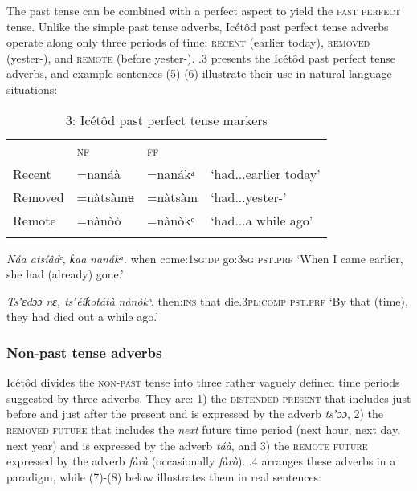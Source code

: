 \begin{table}
The past tense can be combined with a perfect aspect to yield the \textsc{past perfect }tense. Unlike the simple past tense adverbs, Icétôd past perfect tense adverbs operate along only three periods of time: \textsc{recent} (earlier today), \textsc{removed} (yester-), and \textsc{remote} (before yester-). .3 presents the Icétôd past perfect tense adverbs, and example sentences (5)-(6) illustrate their use in natural language situations:


\begin{table}
\caption{3: Icétôd past perfect tense markers}
\label{tab:9}


\begin{tabularx}{\textwidth}{XXXX} & \textsc{nf} & \textsc{ff} & \\
\lsptoprule
Recent & =nanáà & =nanákᵃ & ‘had...earlier today’\\
Removed & =nàtsàmʉ & =nàtsàm & ‘had...yester-’\\
Remote & =nànòò & =nànòkᵒ & ‘had...a while ago’\\
\lspbottomrule
\end{tabularx}
\end{table}



\textit{Náa   atsíâdᵉ,     ƙaa     }\textit{nanákᵃ}.
when  come:\textsc{1sg:dp}   go:\textsc{3sg}   \textsc{pst.prf}
‘When I came earlier, she had (already) gone.’




\textit{Tsʼɛdɔɔ   nɛ,   tsʼéíƙotátà     }\textit{nànòkᵒ}.
then:\textsc{ins}   that   die.\textsc{3pl:comp}   \textsc{pst.prf}
‘By that (time), they had died out a while ago.’




\subsubsection{Non-past tense adverbs}

Icétôd divides the \textsc{non-past }tense into three rather vaguely defined time periods suggested by three adverbs. They are: 1) the \textsc{distended} \textsc{present} that includes just before and just after the present and is expressed by the adverb \textit{tsʼɔɔ}, 2) the \textsc{removed future} that includes the \textit{next} future time period (next hour, next day, next year) and is expressed by the adverb \textit{táà}, and 3) the \textsc{remote future} expressed by the adverb \textit{fàrà }(occasionally \textit{fàrò}). .4 arranges these adverbs in a paradigm, while (7)-(8) below illustrates them in real sentences:



\end{table}
